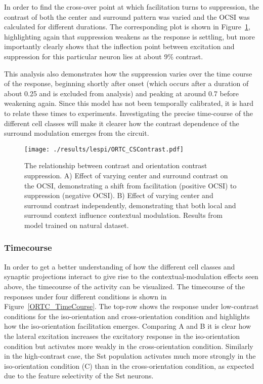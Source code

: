 In order to find the cross-over point at which facilitation turns to
suppression, the contrast of both the center and surround pattern was
varied and the OCSI was calculated for different durations. The
corresponding plot is shown in Figure~\ref{ORTC_ContrastCurve},
highlighting again that suppression weakens as the response is
settling, but more importantly clearly shows that the inflection point between
excitation and suppression for this particular neuron lies at about
9\% contrast.

This analysis also demonstrates how the suppression varies over the
time course of the response, beginning shortly after onset (which
occurs after a duration of about 0.25 and is excluded from analysis)
and peaking at around 0.7 before weakening again. Since this model has
not been temporally calibrated, it is hard to relate these times to
experiments. Investigating the precise time-course of the different
cell classes will make it clearer how the contrast dependence of the
surround modulation emerges from the circuit.

\begin{figure}
	\centering
        \texttt{[image: ./results/lespi/ORTC\_CSContrast.pdf]}
	\caption[Contrast dependent switch from facilitation to
      suppression.]{The relationship between contrast and orientation
      contrast suppression. A) Effect of varying center and surround
      contrast on the OCSI, demonstrating a shift from facilitation
      (positive OCSI) to suppression (negative OCSI). B) Effect of
      varying center and surround contrast independently, demonstrating
      that both local and surround context influence contextual
      modulation. Results from model trained on natural dataset.}
	\label{ORTC_ContrastCurve}
\end{figure}


\subsubsection*{Timecourse}

In order to get a better understanding of how the different cell
classes and synaptic projections interact to give rise to the
contextual-modulation effects seen above, the timecourse of the
activity can be visualized. The timecourse of the responses under four
different conditions is shown in Figure~\ref{ORTC_TimeCourse}. The
top-row shows the response under low-contrast conditions for the
iso-orientation and cross-orientation condition and highlights how the
iso-orientation facilitation emerges. Comparing A and B it is clear 
how the lateral excitation increases the excitatory response in
the iso-orientation condition but activates more weakly in the
cross-orientation condition. Similarly in the high-contrast case, the
Sst population activates much more strongly in the iso-orientation
condition (C) than in the cross-orientation condition, as expected due
to the feature selectivity of the Sst neurons.

